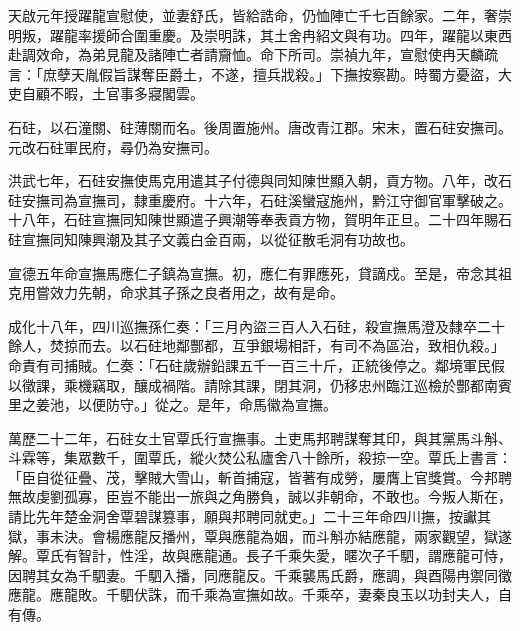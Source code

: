 \begin{pinyinscope}
天啟元年授躍龍宣慰使，並妻舒氏，皆給誥命，仍恤陣亡千七百餘家。二年，奢崇明叛，躍龍率援師合圍重慶。及崇明誅，其土舍冉紹文與有功。四年，躍龍以東西赴調效命，為弟見龍及諸陣亡者請齎恤。命下所司。崇禎九年，宣慰使冉天麟疏言：「庶孽天胤假旨謀奪臣爵土，不遂，擅兵戕殺。」下撫按察勘。時蜀方憂盜，大吏自顧不暇，土官事多寢閣雲。

石砫，以石潼關、砫薄關而名。後周置施州。唐改青江郡。宋末，置石砫安撫司。元改石砫軍民府，尋仍為安撫司。

洪武七年，石砫安撫使馬克用遣其子付德與同知陳世顯入朝，貢方物。八年，改石砫安撫司為宣撫司，隸重慶府。十六年，石砫溪蠻寇施州，黔江守御官軍擊破之。十八年，石砫宣撫同知陳世顯遣子興潮等奉表貢方物，賀明年正旦。二十四年賜石砫宣撫同知陳興潮及其子文義白金百兩，以從征散毛洞有功故也。

宣德五年命宣撫馬應仁子鎮為宣撫。初，應仁有罪應死，貸謫戍。至是，帝念其祖克用嘗效力先朝，命求其子孫之良者用之，故有是命。

成化十八年，四川巡撫孫仁奏：「三月內盜三百人入石砫，殺宣撫馬澄及隸卒二十餘人，焚掠而去。以石砫地鄰酆都，互爭銀場相訐，有司不為區治，致相仇殺。」命責有司捕賊。仁奏：「石砫歲辦鉛課五千一百三十斤，正統後停之。鄰境軍民假以徵課，乘機竊取，釀成禍階。請除其課，閉其洞，仍移忠州臨江巡檢於酆都南賓里之姜池，以便防守。」從之。是年，命馬徽為宣撫。

萬歷二十二年，石砫女土官覃氏行宣撫事。土吏馬邦聘謀奪其印，與其黨馬斗斛、斗霖等，集眾數千，圍覃氏，縱火焚公私廬舍八十餘所，殺掠一空。覃氏上書言：「臣自從征疊、茂，擊賊大雪山，斬首捕寇，皆著有成勞，屢膺上官獎賞。今邦聘無故虔劉孤寡，臣豈不能出一旅與之角勝負，誠以非朝命，不敢也。今叛人斯在，請比先年楚金洞舍覃碧謀篡事，願與邦聘同就吏。」二十三年命四川撫，按讞其獄，事未決。會楊應龍反播州，覃與應龍為姻，而斗斛亦結應龍，兩家觀望，獄遂解。覃氏有智計，性淫，故與應龍通。長子千乘失愛，暱次子千駟，謂應龍可恃，因聘其女為千駟妻。千駟入播，同應龍反。千乘襲馬氏爵，應調，與酉陽冉禦同徵應龍。應龍敗。千駟伏誅，而千乘為宣撫如故。千乘卒，妻秦良玉以功封夫人，自有傳。


\end{pinyinscope}